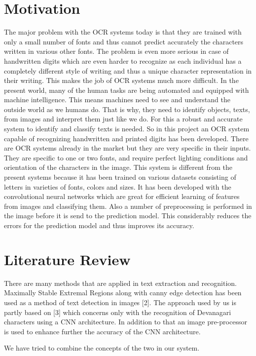 \section{Motivation}
The major problem with the OCR systems today is that they are trained with only a small number of fonts and thus cannot predict accurately the characters written in various other fonts. The problem is even more serious in case of handwritten digits which are even harder to recognize as each individual has a completely different style of writing and thus a unique character representation in their writing. This makes the job of OCR systems much more difficult. 
In the present world, many of the human tasks are being automated and equipped with machine intelligence. This means machines need to see and understand the outside world as we humans do. That is why, they need to identify objects, texts, from images and interpret them just like we do. For this a robust and accurate system to identify and classify texts is needed. So in this project an OCR system capable of recognizing handwritten and printed digits has been developed. 
There are OCR systems already in the market but they are very specific in their inputs. They are specific to one or two fonts, and require perfect lighting conditions and orientation of the characters in the image.
This system is different from the present systems because it has been trained on various datasets consisting of letters in varieties of fonts, colors and sizes. It has been developed with the convolutional neural networks which are great for efficient learning of features from images and classifying them. Also a number of preprocessing is performed in the image before it is send to the prediction model. This considerably reduces the errors for the prediction model and thus improves its accuracy.

\section{Literature Review}
There are many methods that are applied in text extraction and recognition. Maximally Stable Extremal Regions along with canny edge detection has been used as a method of text detection in images [2]. The approach used by us is partly based on [3] which concerns only with the recognition of Devanagari characters using a CNN architecture. In addition to that an image pre-processor is used to enhance further the accuracy of the CNN architecture.

We have tried to combine the concepts of the two in our system. 
